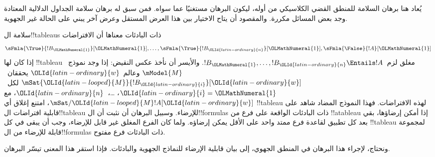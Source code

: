 \documentclass[../../../include/open-logic-section]{subfiles}
\begin{document}


\begin{editorial}
  يُعاد هنا برهان السلامة للمنطق القضي الكلاسيكي من أوله، ليكون البرهان
  مستغنيًا عما سواه. فمن سبق له برهان سلامة الجداول الدلالية المعتادة
  وجد بعض المسائل مكررة. والمقصود أن يتاح الاختيار بين هذا العرض
  المستقل وعرض آخر يبني على الحالة غير الجهوية.
\end{editorial}

\begin{explain}
  سلامة ال!!{tableau}s ذات البادئات معناها أن الافتراضات
  \[
  \sFmla{\True}{!B_\OLMathNumeral{1}}[\OLMathNumeral{1}], \dots, \sFmla{\True}{!B_\OLId{latin-ordinary}{n}}[\OLMathNumeral{1}], \sFmla{\False}{!A}[\OLMathNumeral{1}]
  \]
  إذا كان لها !!{tableau} مغلق لزم~$!B_\OLMathNumeral{1}, \dots, !B_\OLId{latin-ordinary}{n} \Entails !A$.
  والأيسر أن نأخذ عكس النقيض: إذا وجد نموذج~$\mModel{M}$ وعالم~$\OLId{latin-ordinary}{w}$
  يحققان~$\mSat{\OLId{latin-looped}{M}}{!B_\OLId{latin-ordinary}{i}}[\OLId{latin-ordinary}{w}]$ لكل~$\OLId{latin-ordinary}{i}=\OLMathNumeral{1}$، \dots،~$\OLId{latin-ordinary}{n}$، مع
  $\mSat/{\OLId{latin-looped}{M}}{!A}[\OLId{latin-ordinary}{w}]$، امتنع إغلاق أي !!{tableau} لهذه الافتراضات.
  فهذا النموذج المضاد شاهد على قابلية افتراضات ال!!{tableau} للإرضاء.
  وسبيل البرهان أن نثبت أن ال!!{formula}s ذات البادئات الواقعة على
  فرع من !!a{tableau} إذا أمكن إرضاؤها، بقي بعد كل تطبيق لقاعدة
  فرع ممتد واحد على الأقل يمكن إرضاؤه. ولما كان الفرع المغلق غير قابل
  للإرضاء، وجب أن يبقى في كل !!{tableau} لمجموعة قابلة للإرضاء من
  ال!!{formula}s ذات البادئات فرع مفتوح.

  ونحتاج، لإجراء هذا البرهان في المنطق الجهوي، إلى بيان قابلية الإرضاء
  للنماذج الجهوية والبادئات. فإذا استقر هذا المعنى تيسّر البرهان.
\end{explain}
\end{document}
